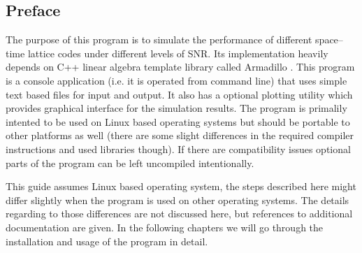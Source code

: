 \documentclass[english,12pt,a4paper,pdftex,sci,utf8]{aaltothesis}
\begin{document}
\subsection{Preface}
The purpose of this program is to simulate the performance of different space--time lattice codes under different levels of SNR. Its implementation heavily depends on C++ linear algebra template library called Armadillo \cite{arma}. This program is a console application (i.e. it is operated from command line) that uses simple text based files for input and output. It also has a optional plotting utility which provides graphical interface for the simulation results. The program is primalily intented to be used on Linux based operating systems but should be portable to other platforms as well (there are some slight differences in the required compiler instructions and used libraries though). If there are compatibility issues optional parts of the program can be left uncompiled intentionally. 
\par This guide assumes Linux based operating system, the steps described here might differ slightly when the program is used on other operating systems. The details regarding to those differences are not discussed here, but references to additional documentation are given. In the following chapters we will go through the installation and usage of the program in detail. 
\end{document}
